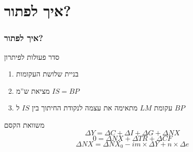 \documentclass[usenames,dvipsnames]{beamer}
\newcommand{\D}[1]{\Delta #1}
\newcommand{\heart}{\ensuremath\heartsuit}
\begin{document}
\begin{RTL}
\begin{frame}
    

\end{frame}

\section{איך לפתור?}
\begin{frame}
    \frametitle{איך לפתור?}
    \begin{exampleblock}{סדר פעולות לפיתרון}
        \begin{enumerate}
            \item בניית שלושת העקומות
            \item מציאת ש''מ $IS = BP$
            \item עקומת $LM$ מתאימה את עצמה לנקודת החיתוך בין $IS$ ל $BP$
        \end{enumerate}
    \end{exampleblock}

    \begin{block}{משוואת הקסם}
        $$\D Y = \D C + \D I  + \D G + \D NX$$
        $$0 = \D NX + \D TR + \D CF$$
        $$\D NX = \D NX_0 - im \times \D Y + n \times \D e$$
    \end{block}
    

\end{frame}
\end{RTL}
\end{document}

